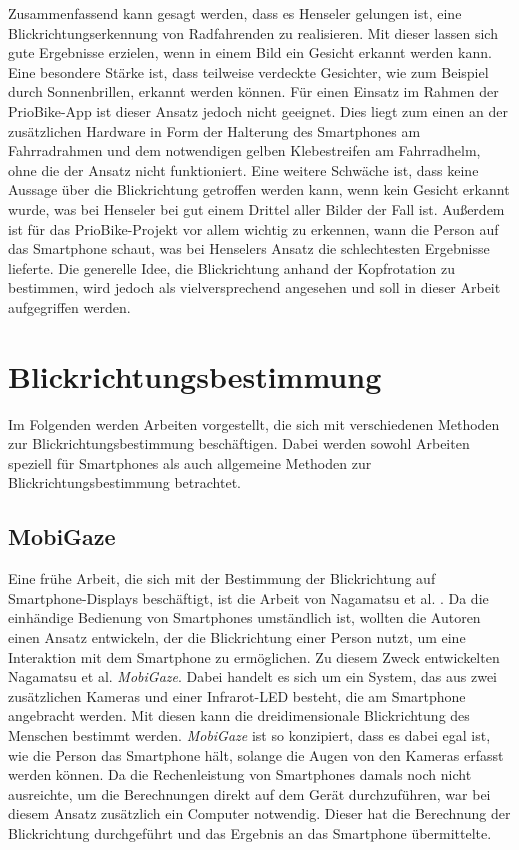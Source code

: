Zusammenfassend kann gesagt werden, dass es Henseler gelungen ist, eine Blickrichtungserkennung von Radfahrenden zu realisieren. Mit dieser lassen sich gute Ergebnisse erzielen, wenn in einem Bild ein Gesicht erkannt werden kann. Eine besondere Stärke ist, dass teilweise verdeckte Gesichter, wie zum Beispiel durch Sonnenbrillen, erkannt werden können. Für einen Einsatz im Rahmen der PrioBike-App ist dieser Ansatz jedoch nicht geeignet. Dies liegt zum einen an der zusätzlichen Hardware in Form der Halterung des Smartphones am Fahrradrahmen und dem notwendigen gelben Klebestreifen am Fahrradhelm, ohne die der Ansatz nicht funktioniert. Eine weitere Schwäche ist, dass keine Aussage über die Blickrichtung getroffen werden kann, wenn kein Gesicht erkannt wurde, was bei Henseler bei gut einem Drittel aller Bilder der Fall ist. Außerdem ist für das PrioBike-Projekt vor allem wichtig zu erkennen, wann die Person auf das Smartphone schaut, was bei Henselers Ansatz die schlechtesten Ergebnisse lieferte. Die generelle Idee, die Blickrichtung anhand der Kopfrotation zu bestimmen, wird jedoch als vielversprechend angesehen und soll in dieser Arbeit aufgegriffen werden.

\section{Blickrichtungsbestimmung}\label{sec:related:gaze}

Im Folgenden werden Arbeiten vorgestellt, die sich mit verschiedenen Methoden zur Blickrichtungsbestimmung beschäftigen. Dabei werden sowohl Arbeiten speziell für Smartphones als auch allgemeine Methoden zur Blickrichtungsbestimmung betrachtet.

\subsection{MobiGaze}\label{sec:related:gaze:model:mobigaze}

Eine frühe Arbeit, die sich mit der Bestimmung der Blickrichtung auf Smartphone-Displays beschäftigt, ist die Arbeit von Nagamatsu et al. \cite{paper:mobigaze}. Da die einhändige Bedienung von Smartphones umständlich ist, wollten die Autoren einen Ansatz entwickeln, der die Blickrichtung einer Person nutzt, um eine Interaktion mit dem Smartphone zu ermöglichen. Zu diesem Zweck entwickelten Nagamatsu et al. \textit{MobiGaze}. Dabei handelt es sich um ein System, das aus zwei zusätzlichen Kameras und einer Infrarot-LED besteht, die am Smartphone angebracht werden. Mit diesen kann die dreidimensionale Blickrichtung des Menschen bestimmt werden. \textit{MobiGaze} ist so konzipiert, dass es dabei egal ist, wie die Person das Smartphone hält, solange die Augen von den Kameras erfasst werden können. Da die Rechenleistung von Smartphones damals noch nicht ausreichte, um die Berechnungen direkt auf dem Gerät durchzuführen, war bei diesem Ansatz zusätzlich ein Computer notwendig. Dieser hat die Berechnung der Blickrichtung durchgeführt und das Ergebnis an das Smartphone übermittelte.  

